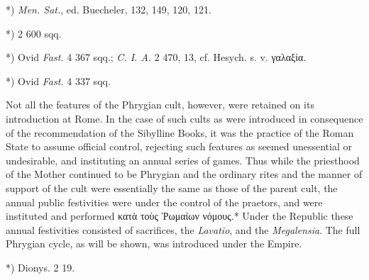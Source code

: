 \documentclass[a4paper, 11pt, oneside, polutonikogreek, english]{article}
\begin{document}
*) \emph{Men. Sat.}, ed. Buecheler, 132, 149, 120, 121.

*) 2 600 sqq.

*) Ovid \emph{Fast.} 4 367 sqq.; \emph{C. I. A.} 2 470, 13, cf. Hesych. s. v. γαλαξία.

*) Ovid \emph{Fast.} 4 337 sqq.

Not all the features of the Phrygian cult, however, were retained on its introduction at Rome. In the case of such cults as were introduced in consequence of the recommendation of the Sibylline Books, it was the practice of the Roman State to assume official control, rejecting such features as seemed unessential or undesirable, and instituting an annual series of games. Thus while the priesthood of the Mother continued to be Phrygian and the ordinary rites and the manner of support of the cult were essentially the same as those of the parent cult, the annual public festivities were under the control of the praetors, and were instituted and performed κατὰ τοὺς Ῥωμαίων νόμους.* Under the Republic these annual festivities consisted of sacrifices, the \emph{Lavatio}, and the \emph{Megalensia}. The full Phrygian cycle, as will be shown, was introduced under the Empire.

*) Dionys. 2 19.
\end{document}
